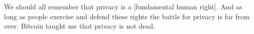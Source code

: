 We should all remember that privacy is a [fundamental human right]. And
as long as people exercise and defend these rights the battle for
privacy is far from over. Bitcoin taught me that privacy is not dead.

%
%
%
%
